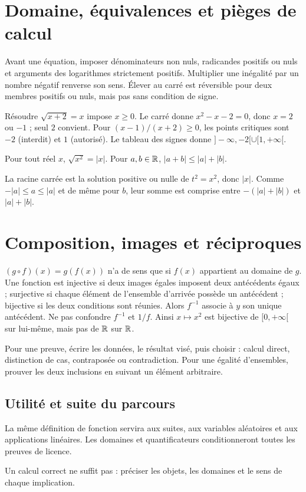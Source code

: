 \documentclass[../cours_tle.tex]{subfiles}
\begin{document}
\section{Domaine, équivalences et pièges de calcul}
Avant une équation, imposer dénominateurs non nuls, radicandes positifs ou nuls et arguments des logarithmes strictement positifs.
Multiplier une inégalité par un nombre négatif renverse son sens. Élever au carré est réversible pour deux membres positifs ou nuls, mais pas sans condition de signe.
\begin{exemple}
Résoudre $\sqrt{x+2}=x$ impose $x\ge0$. Le carré donne $x^2-x-2=0$, donc $x=2$ ou $-1$ ; seul $2$ convient.
Pour $(x-1)/(x+2)\ge0$, les points critiques sont $-2$ (interdit) et $1$ (autorisé). Le tableau des signes donne $]-\infty,-2[\cup[1,+\infty[$.
\end{exemple}
\begin{propriete}
Pour tout réel $x$, $\sqrt{x^2}=|x|$. Pour $a,b\in\mathbb{R}$, $|a+b|\le|a|+|b|$.
\end{propriete}
\begin{demonstration}
La racine carrée est la solution positive ou nulle de $t^2=x^2$, donc $|x|$.
Comme $-|a|\le a\le|a|$ et de même pour $b$, leur somme est comprise entre $-(|a|+|b|)$ et $|a|+|b|$.
\end{demonstration}
\section{Composition, images et réciproques}
$(g\circ f)(x)=g(f(x))$ n'a de sens que si $f(x)$ appartient au domaine de $g$.
Une fonction est injective si deux images égales imposent deux antécédents égaux ; surjective si chaque élément de l'ensemble d'arrivée possède un antécédent ; bijective si les deux conditions sont réunies.
Alors $f^{-1}$ associe à $y$ son unique antécédent. Ne pas confondre $f^{-1}$ et $1/f$.
Ainsi $x\mapsto x^2$ est bijective de $[0,+\infty[$ sur lui-même, mais pas de $\mathbb{R}$ sur $\mathbb{R}$.

\begin{methode}
Pour une preuve, écrire les données, le résultat visé, puis choisir : calcul direct, distinction de cas, contraposée ou contradiction. Pour une égalité d'ensembles, prouver les deux inclusions en suivant un élément arbitraire.
\end{methode}
\begin{finchapitre}
\section{Utilité et suite du parcours}
La même définition de fonction servira aux suites, aux variables aléatoires et aux applications linéaires. Les domaines et quantificateurs conditionneront toutes les preuves de licence.
\begin{retenir}
Un calcul correct ne suffit pas : préciser les objets, les domaines et le sens de chaque implication.
\end{retenir}
\end{finchapitre}
\end{document}
